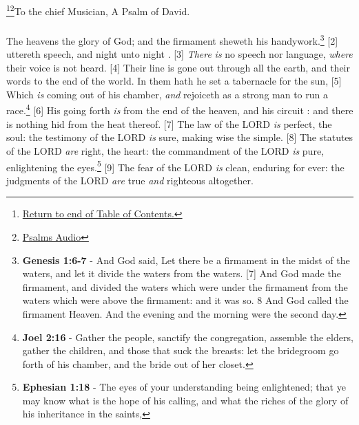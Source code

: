 \footnote{\textcolor[cmyk]{0.99998,1,0,0}{\hyperlink{TOC}{Return to end of Table of Contents.}}}\footnote{\href{https://www.audioverse.org/english/audiobibles/books/ENGKJV/O/Ps/1}{\textcolor[cmyk]{0.99998,1,0,0}{Psalms Audio}}}\textcolor[cmyk]{0.99998,1,0,0}{To the chief Musician, A Psalm of David.}\\
\\
\textcolor[cmyk]{0.99998,1,0,0}{The heavens  the glory of God; and the firmament sheweth his handywork.}\footnote{\textbf{Genesis 1:6-7} - And God said, Let there be a firmament in the midst of the waters, and let it divide the waters from the waters. [7] And God made the firmament, and divided the waters which were under the firmament from the waters which were above the firmament: and it was so. 8 And God called the firmament Heaven. And the evening and the morning were the second day.}
[2] \textcolor[cmyk]{0.99998,1,0,0}{ uttereth speech, and night unto night  .}
[3] \textcolor[cmyk]{0.99998,1,0,0}{\emph{There} \emph{is} no speech nor language, \emph{where} their voice is not heard.}
[4] \textcolor[cmyk]{0.99998,1,0,0}{Their line is gone out through all the earth, and their words to the end of the world. In them hath he set a tabernacle for the sun,}
[5] \textcolor[cmyk]{0.99998,1,0,0}{Which \emph{is}  coming out of his chamber, \emph{and} rejoiceth as a strong man to run a race.}\footnote{\textbf{Joel 2:16} -  Gather the people, sanctify the congregation, assemble the elders, gather the children, and those that suck the breasts: let the bridegroom go forth of his chamber, and the bride out of her closet.}
[6] \textcolor[cmyk]{0.99998,1,0,0}{His going forth \emph{is} from the end of the heaven, and his circuit : and there is nothing hid from the heat thereof.}
[7] \textcolor[cmyk]{0.99998,1,0,0}{The law of the LORD \emph{is} perfect,  the soul: the testimony of the LORD \emph{is} sure, making wise the simple.}
[8] \textcolor[cmyk]{0.99998,1,0,0}{The statutes of the LORD \emph{are} right,  the heart: the commandment of the LORD \emph{is} pure, enlightening the eyes.}\footnote{\textbf{Ephesian 1:18} - The eyes of your understanding being enlightened; that ye may know what is the hope of his calling, and what the riches of the glory of his inheritance in the saints,}
[9] \textcolor[cmyk]{0.99998,1,0,0}{The fear of the LORD \emph{is} clean, enduring for ever: the judgments of the LORD \emph{are} true \emph{and} righteous altogether.}
